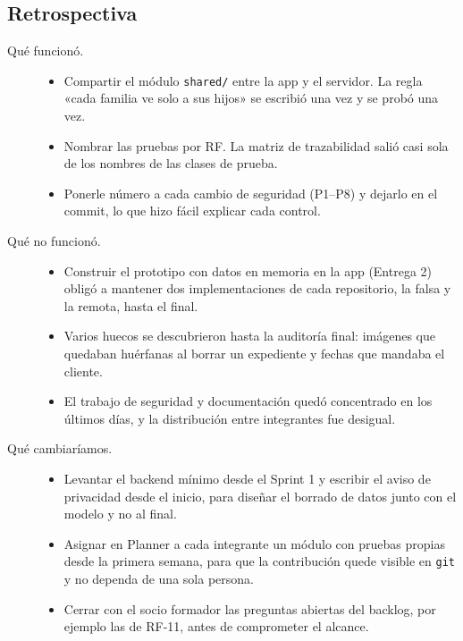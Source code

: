 \subsection{Retrospectiva}
\begin{description}
	\item[Qué funcionó.]
	\begin{itemize}
		\item Compartir el módulo \texttt{shared/\allowbreak{}} entre la app y el servidor. La regla «cada familia ve solo a sus hijos» se escribió una vez y se probó una vez.
		\item Nombrar las pruebas por RF. La matriz de trazabilidad salió casi sola de los nombres de las clases de prueba.
		\item Ponerle número a cada cambio de seguridad (P1--P8) y dejarlo en el commit, lo que hizo fácil explicar cada control.
	\end{itemize}
	\item[Qué no funcionó.]
	\begin{itemize}
		\item Construir el prototipo con datos en memoria en la app (Entrega 2) obligó a mantener dos implementaciones de cada repositorio, la falsa y la remota, hasta el final.
		\item Varios huecos se descubrieron hasta la auditoría final: imágenes que quedaban huérfanas al borrar un expediente y fechas que mandaba el cliente.
		\item El trabajo de seguridad y documentación quedó concentrado en los últimos días, y la distribución entre integrantes fue desigual.
	\end{itemize}
	\item[Qué cambiaríamos.]
	\begin{itemize}
		\item Levantar el backend mínimo desde el Sprint 1 y escribir el aviso de privacidad desde el inicio, para diseñar el borrado de datos junto con el modelo y no al final.
		\item Asignar en Planner a cada integrante un módulo con pruebas propias desde la primera semana, para que la contribución quede visible en \texttt{git} y no dependa de una sola persona.
		\item Cerrar con el socio formador las preguntas abiertas del backlog, por ejemplo las de RF-11, antes de comprometer el alcance.
	\end{itemize}
\end{description}
